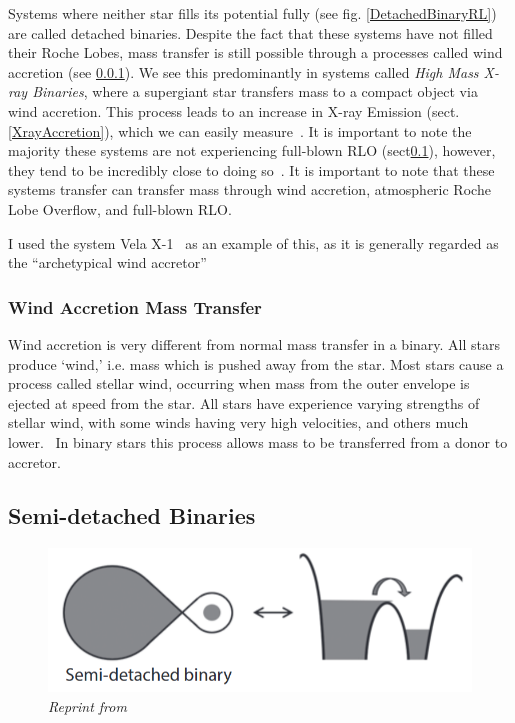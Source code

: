 \documentclass[12pt, a4paper]{article}
\begin{document}
        Systems where neither star fills its potential fully (see fig. \ref{DetachedBinaryRL}) are called detached binaries. Despite the fact that these systems have not filled their Roche Lobes, mass transfer is still possible through a processes called wind accretion (see \ref{WindAccretion}). We see this predominantly in systems called \textit{High Mass X-ray Binaries}, where a supergiant star transfers mass to a compact object via wind accretion. This process leads to an increase in X-ray Emission (sect. \ref{XrayAccretion}), which we can easily measure~\parencite{TaurisvandenHeuvel+2023}. It is important to note the majority these systems are not experiencing full-blown RLO (sect\ref{RLO}), however, they tend to be incredibly close to doing so~\parencite{TaurisvandenHeuvel+2023}. It is important to note that these systems transfer can transfer mass through wind accretion, atmospheric Roche Lobe Overflow, and full-blown RLO. 

        I used the system Vela X-1~\parencite{Kretschmar_2021} as an example of this, as it is generally regarded as the ``archetypical wind accretor''~\parencite{Kretschmar_2021} 

        \subsubsection{Wind Accretion Mass Transfer} \label{WindAccretion}
        Wind accretion is very different from normal mass transfer in a binary. All stars produce `wind,' i.e. mass which is pushed away from the star. Most stars cause a process called stellar wind, occurring when mass from the outer envelope is ejected at speed from the star. All stars have experience varying strengths of stellar wind, with some winds having very high velocities, and others much lower.~\parencite{Lamers_1999} In binary stars this process allows mass to be transferred from a donor to accretor.
        
        \subsection{\centering Semi-detached Binaries}\label{RLO} %

        \begin{figure}[h] 
            \centering
            \includegraphics[scale = .4]{figs/reused-figs/Tauris_Semi-detachedBinary.png}
            \caption{\textit{Reprint from~\parencite{TaurisvandenHeuvel+2023}}}
            \label{SemidetachedRL}
        \end{figure}
\end{document}

